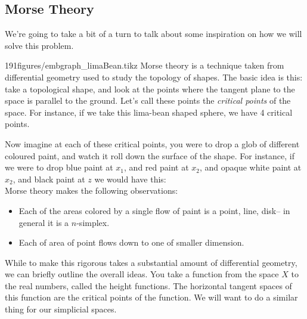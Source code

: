 \subsection{Morse Theory}
We're going to take a bit of a turn to talk about some inspiration on how we will solve this problem. \\
\begin{paragraphfigureenv}{191figures/embgraph_limaBean.tikz}
	Morse theory is a technique taken from differential geometry used to study the topology of shapes. The basic idea is this: take a topological shape,  and look at the points where the tangent plane to the space is parallel to the ground. Let's call these points the \emph{critical points} of the space. For instance,  if we take this lima-bean shaped sphere,  we have 4 critical points.
\end{paragraphfigureenv}
Now imagine at each of these critical points,  you were to drop a glob of different coloured paint,  and watch it roll down the surface of the shape. For instance,  if we were to drop blue paint at $x_1$,  and red paint at $x_2$, and opaque white paint at $x_2$,  and black paint at $z$ we would have this:
\[\]
Morse theory makes the following observations:
\begin{itemize} 
	\item Each of the areas colored by a single flow of paint is a point,  line,  disk-- in general it is a $n$-simplex. 
	\item Each of area of point flows down to one of smaller dimension.
\end{itemize}
While to make this rigorous takes a substantial amount of differential geometry,  we can briefly outline the overall ideas. You take a function from the space $X$ to the real numbers,  called the height functions. The horizontal tangent spaces of this function are the critical points of the function. We will want to do a similar thing for our simplicial spaces.

